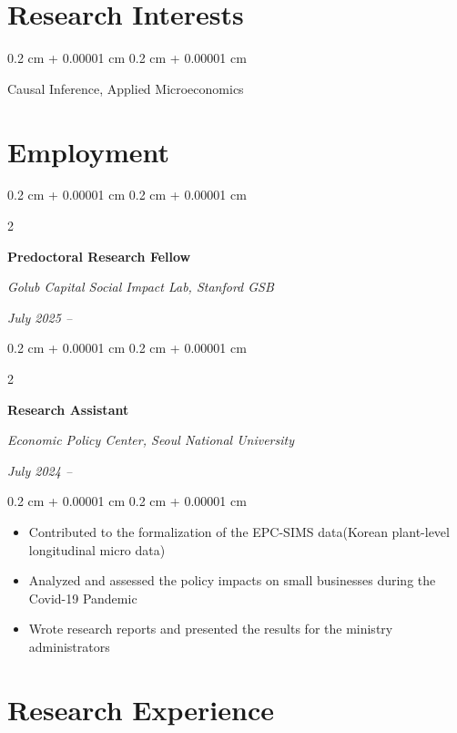 \documentclass[10pt, letterpaper]{article}
\newenvironment{highlights}{
	\begin{itemize}[
		topsep=0.10 cm,
		parsep=0.10 cm,
		partopsep=0pt,
		itemsep=0pt,
		leftmargin=0.4 cm + 10pt
		]
	}{
	\end{itemize}
} %
\newenvironment{onecolentry}{
	\begin{adjustwidth}{
			0.2 cm + 0.00001 cm
		}{
			0.2 cm + 0.00001 cm
		}
	}{
	\end{adjustwidth}
} %
\newenvironment{twocolentry}[2][]{
	\onecolentry
	\def\secondColumn{#2}
	\setcolumnwidth{\fill, 4.5 cm}
	\begin{paracol}{2}
	}{
		\switchcolumn \raggedleft \secondColumn
	\end{paracol}
	\endonecolentry
} %
\begin{document}
	
	
	
		\section{Research Interests}
	
	\begin{onecolentry}
Causal Inference, Applied Microeconomics
	\end{onecolentry}
	
	\vspace{0.2 cm}
	
	
	\section{Employment}
	
			\begin{twocolentry}{
			\textit{July 2025 –}    
			
			\textit{}}
		\textbf{Predoctoral Research Fellow}
		
		\textit{Golub Capital Social Impact Lab, Stanford GSB}
	\end{twocolentry}
	
	\vspace{0.20cm}
		\begin{twocolentry}{
			\textit{July 2024 –}    
			
			\textit{}}
		\textbf{Research Assistant}
		
		\textit{Economic Policy Center, Seoul National University}
	\end{twocolentry}
	
	\vspace{0.10 cm}
	\begin{onecolentry}
		\begin{highlights}
			\item Contributed to the formalization of the EPC-SIMS data(Korean plant-level longitudinal micro data)
			\item Analyzed and assessed the policy impacts on small businesses during the Covid-19 Pandemic
			\item Wrote research reports and presented the results for the ministry administrators
		\end{highlights}
	\end{onecolentry}
	
	
	\vspace{0.2 cm}
	
	\section{Research Experience}
	
\end{document}
